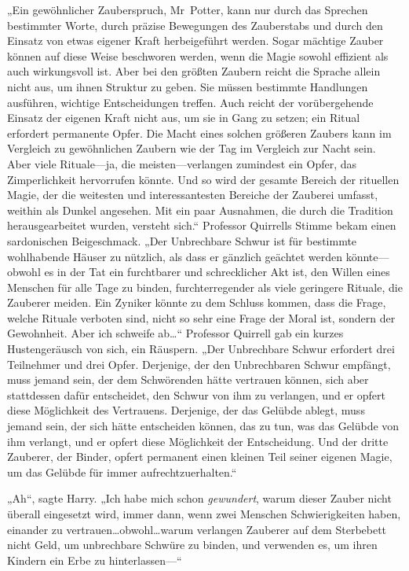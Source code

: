 „Ein gewöhnlicher Zauberspruch, Mr~Potter, kann nur durch das Sprechen bestimmter Worte, durch präzise Bewegungen des Zauberstabs und durch den Einsatz von etwas eigener Kraft herbeigeführt werden. Sogar mächtige Zauber können auf diese Weise beschworen werden, wenn die Magie sowohl effizient als auch wirkungsvoll ist. Aber bei den größten Zaubern reicht die Sprache allein nicht aus, um ihnen Struktur zu geben. Sie müssen bestimmte Handlungen ausführen, wichtige Entscheidungen treffen. Auch reicht der vorübergehende Einsatz der eigenen Kraft nicht aus, um sie in Gang zu setzen; ein Ritual erfordert permanente Opfer. Die Macht eines solchen größeren Zaubers kann im Vergleich zu gewöhnlichen Zaubern wie der Tag im Vergleich zur Nacht sein. Aber viele Rituale—ja, die meisten—verlangen zumindest ein Opfer, das Zimperlichkeit hervorrufen könnte. Und so wird der gesamte Bereich der rituellen Magie, der die weitesten und interessantesten Bereiche der Zauberei umfasst, weithin als Dunkel angesehen. Mit ein paar Ausnahmen, die durch die Tradition herausgearbeitet wurden, versteht sich.“ Professor Quirrells Stimme bekam einen sardonischen Beigeschmack.
„Der Unbrechbare Schwur ist für bestimmte wohlhabende Häuser zu nützlich, als dass er gänzlich geächtet werden könnte—obwohl es in der Tat ein furchtbarer und schrecklicher Akt ist, den Willen eines Menschen für alle Tage zu binden, furchterregender als viele geringere Rituale, die Zauberer meiden. Ein Zyniker könnte zu dem Schluss kommen, dass die Frage, welche Rituale verboten sind, nicht so sehr eine Frage der Moral ist, sondern der Gewohnheit. Aber ich schweife ab…“ Professor Quirrell gab ein kurzes Hustengeräusch von sich, ein Räuspern.
„Der Unbrechbare Schwur erfordert drei Teilnehmer und drei Opfer. Derjenige, der den Unbrechbaren Schwur empfängt, muss jemand sein, der dem Schwörenden hätte vertrauen können, sich aber stattdessen dafür entscheidet, den Schwur von ihm zu verlangen, und er opfert diese Möglichkeit des Vertrauens. Derjenige, der das Gelübde ablegt, muss jemand sein, der sich hätte entscheiden können, das zu tun, was das Gelübde von ihm verlangt, und er opfert diese Möglichkeit der Entscheidung. Und der dritte Zauberer, der Binder, opfert permanent einen kleinen Teil seiner eigenen Magie, um das Gelübde für immer aufrechtzuerhalten.“

„Ah“, sagte Harry.
„Ich habe mich schon \emph{gewundert}, warum dieser Zauber nicht überall eingesetzt wird, immer dann, wenn zwei Menschen Schwierigkeiten haben, einander zu vertrauen…obwohl…warum verlangen Zauberer auf dem Sterbebett nicht Geld, um unbrechbare Schwüre zu binden, und verwenden es, um ihren Kindern ein Erbe zu hinterlassen—“

